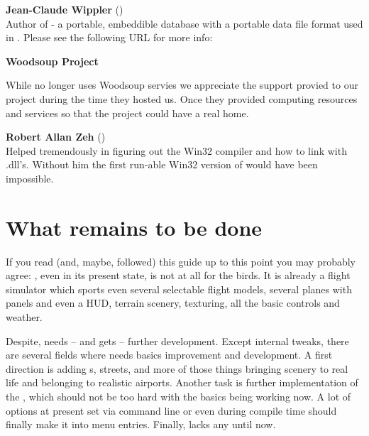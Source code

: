  \noindent \textbf{Jean-Claude Wippler}
 ()\\
  Author of  - a portable, embeddible database with a portable
  data file format used in \FlightGear{}. Please see the following URL for more info:
 \medskip

  \medskip

\noindent \textbf{Woodsoup Project}\\


While \FlightGear{} no longer uses Woodsoup servies we appreciate the support provied to our project during the time they hosted us. Once they provided computing resources and services so that the \FlightGear{} project could have a real home.


\noindent \textbf{Robert Allan Zeh} ()\\
  Helped tremendously in figuring out the  Win32 compiler and
  how to link with .dll's.  Without him the first run-able Win32
  version of \FlightGear{} would have been impossible.

\section{What remains to be done}

If you read (and, maybe, followed) this guide up to this point you may probably agree: \FlightGear{}$\!$, even in its present state, is not at all for the birds. It is
already a flight simulator which sports even several selectable flight models, several planes with panels and even a HUD, terrain scenery, texturing, all the basic controls and weather.

Despite, \FlightGear{} needs -- and gets -- further development. Except internal tweaks,
there are several fields where \FlightGear{} needs basics improvement and development. A
first direction is adding s, streets, and more of those things bringing
scenery to real life and belonging to realistic airports. Another task is further
implementation of the , which should not be too hard with the basics
being working now. A lot of options at present set via command line or even during
compile time should finally make it into menu entries. Finally, \FlightGear{} lacks any
 until now. 

